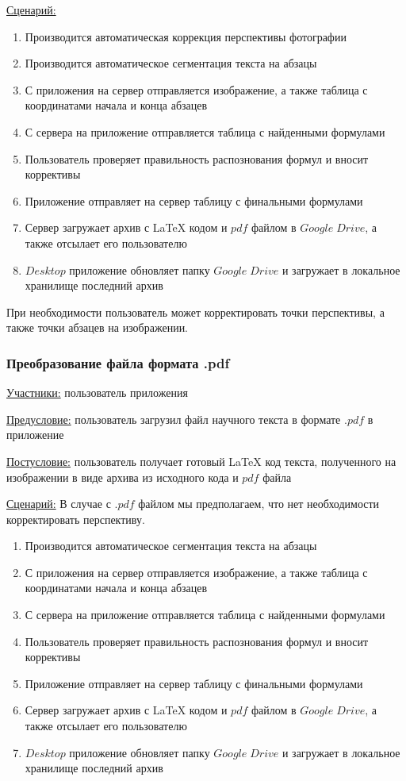 \underline{Сценарий:}
\begin{enumerate}
    \item Производится автоматическая коррекция перспективы фотографии
    \item Производится автоматическое сегментация текста на абзацы
    \item С приложения на сервер отправляется изображение, а также таблица с координатами начала и конца абзацев
    \item С сервера на приложение отправляется таблица с найденными формулами
    \item Пользователь проверяет правильность распознования формул и вносит коррективы
    \item Приложение отправляет на сервер таблицу с финальными формулами
    \item Сервер загружает архив с \LaTeX\; кодом и $pdf$ файлом в $Google\;Drive$, а также отсылает его пользователю
    \item $Desktop$ приложение обновляет папку $Google\;Drive$ и загружает в локальное хранилище последний архив
\end{enumerate}

При необходимости пользователь может корректировать точки перспективы, а также точки абзацев на изображении.

\subsubsection{Преобразование файла формата .pdf}
\underline{Участники:} пользователь приложения

\underline{Предусловие:} пользователь загрузил файл научного текста в формате $.pdf$ в приложение

\underline{Постусловие:} пользователь получает готовый \LaTeX\; код текста, полученного на изображении в виде архива из исходного кода и $pdf$ файла

\underline{Сценарий:}
В случае с $.pdf$ файлом мы предполагаем, что нет необходимости корректировать перспективу.
\begin{enumerate}
    \item Производится автоматическое сегментация текста на абзацы
    \item С приложения на сервер отправляется изображение, а также таблица с координатами начала и конца абзацев
    \item С сервера на приложение отправляется таблица с найденными формулами
    \item Пользователь проверяет правильность распознования формул и вносит коррективы
    \item Приложение отправляет на сервер таблицу с финальными формулами
    \item Сервер загружает архив с \LaTeX\; кодом и $pdf$ файлом в $Google\;Drive$, а также отсылает его пользователю
    \item $Desktop$ приложение обновляет папку $Google\;Drive$ и загружает в локальное хранилище последний архив
\end{enumerate}

